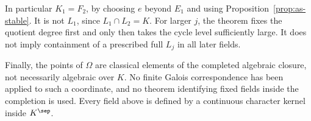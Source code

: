 In particular \(K_1=F_2\), by choosing \(e\) beyond \(E_1\)
and using Proposition~\ref{prop:as-stable}.
It is not \(L_1\), since \(L_1\cap L_2=K\).
For larger \(j\), the theorem fixes the quotient degree
first and only then takes the cycle level sufficiently
large. It does not imply containment of a prescribed
full \(L_j\) in all later fields.

Finally, the points of \(\Omega\) are classical elements
of the completed algebraic closure, not necessarily
algebraic over \(K\). No finite Galois correspondence has
been applied to such a coordinate, and no theorem
identifying fixed fields inside the completion is used.
Every field above is defined by a continuous character
kernel inside \(K^\sep\).
